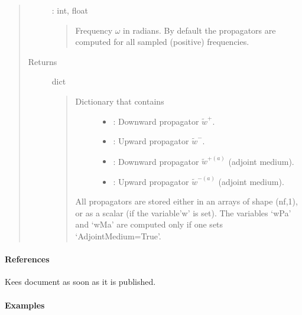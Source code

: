 \documentclass[letterpaper,10pt,english]{sphinxmanual}
\begin{document}
\begin{fulllineitems}
\begin{fulllineitems}
\begin{quote}
\begin{description}
 : int, float
\begin{quote}

Frequency \(\omega\) in radians. By default the propagators are computed for all sampled (positive) frequencies.
\end{quote}

\item[{Returns}] \leavevmode
dict
\begin{quote}
\begin{description}
\item[{Dictionary that contains }] \leavevmode\begin{itemize}
\item {} 
: Downward propagator \(\tilde{w}^+\).

\item {} 
: Upward propagator \(\tilde{w}^-\).

\item {} 
: Downward propagator \(\tilde{w}^{+(a)}\) (adjoint medium).

\item {} 
: Upward propagator \(\tilde{w}^{-(a)}\) (adjoint medium).

\end{itemize}

\end{description}

All propagators are stored either in an arrays of shape (nf,1), or as a scalar (if the variable’w’ is set). The variables ‘wPa’ and ‘wMa’ are computed only if one sets ‘AdjointMedium=True’.
\end{quote}

\end{description}\end{quote}
\paragraph{References}

Kees document as soon as it is published.
\paragraph{Examples}

%
\begin{sphinxVerbatim}[commandchars=\\\{\}]
     
   
\end{sphinxVerbatim}


\end{fulllineitems}
\end{fulllineitems}
\end{document}
